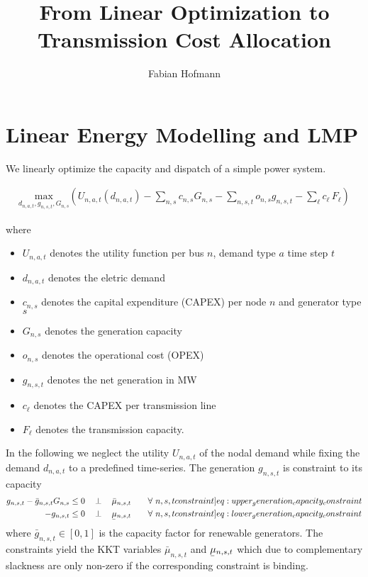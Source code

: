 \documentclass[11pt]{article}
\newcommand{\ubar}[1]{\underaccent{\bar}{#1}}
\newcommand{\generation}{g_{n,s,t}}
\newcommand{\generationpotential}{\bar{g}_{n,s,t}}
\newcommand{\capacityGeneration}{G_{n,s}}
\newcommand{\capacityFlow}{F_{\ell}}
\newcommand{\capexGeneration}{c_{n,s}}
\newcommand{\capexFlow}{c_{\ell}}
\newcommand{\opexGeneration}[1][n]{o_{#1,s}}
\newcommand{\demand}[1][n]{d_{#1,a,t}}
\newcommand{\utility}{U_{n,a,t}}
\newcommand{\mulowergeneration}[1][n]{\ubar{\mu}_{#1,s,t}}
\newcommand{\muuppergeneration}[1][n]{\bar{\mu}_{#1,s,t}}
\newcommand{\resultsin}[1]{\hspace{12pt} \bot  \hspace{12pt} #1}
\newcommand{\Forall}[1]{\hspace{20pt} \forall \,\, #1 }
\begin{document}
\title{From Linear Optimization to Transmission Cost Allocation}
\author{Fabian Hofmann}

\maketitle



\section*{Linear Energy Modelling and LMP}
We linearly optimize the capacity and dispatch of a simple power system. 

\begin{align}
    \underset{\demand, \generation, \capacityGeneration}{\text{max}}
    \left(\utility(\demand) - \sum_{n,s} \capexGeneration \capacityGeneration - \sum_{n, s, t} \opexGeneration \generation - \sum_{\ell} \capexFlow \, \capacityFlow \right) \label{eq:minisation}
\end{align}

where 
\begin{itemize}
\item[] $\utility$ denotes the utility function per bus $n$, demand type $a$ time step $t$ 
 \item[] $\demand$ denotes the eletric demand 
 \item[] $\capexGeneration$ denotes the capital expenditure (CAPEX) per node $n$ and generator type $s$
 \item[] $\capacityGeneration$ denotes the generation capacity
 \item[] $\opexGeneration$ denotes the operational cost (OPEX)
 \item[] $\generation$ denotes the net generation in MW
 \item[] $\capexFlow$ denotes the CAPEX per transmission line 
 \item[] $\capacityFlow$ denotes the transmission capacity.
\end{itemize}

\noindent
In the following we neglect the utility $\utility$ of the nodal demand while fixing the demand $\demand$ to a predefined time-series. The generation $\generation$ is constraint to its capacity
\begin{align}
 \generation - \generationpotential \capacityGeneration  &\le 0 \resultsin{\muuppergeneration}\Forall{n,s,t} 
 \label[constraint]{eq:upper_generation_capacity_constraint}\\ 
 - \generation &\le 0 \resultsin{\mulowergeneration} \Forall{n,s,t} 
 \label[constraint]{eq:lower_generation_capacity_constraint}
 \end{align}
where $\generationpotential \in \left[ 0,1\right]$ is the capacity factor for renewable generators. The constraints yield the KKT variables $\muuppergeneration$ and $\mulowergeneration$ which due to complementary slackness are only non-zero if the corresponding constraint is binding. 
\end{document}
